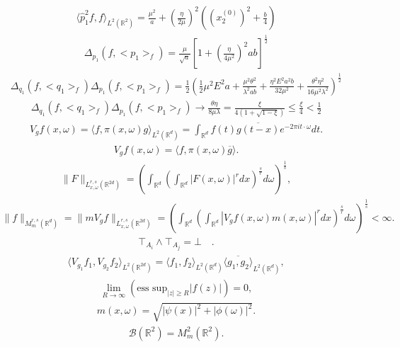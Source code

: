 \begin{align*}\langle \widehat{p}_1^2 f ,f \rangle_{L^2 (\mathbb{R}^2)}= \frac{\mu^2}{a} + \left(\frac{\eta}{2 \mu} \right)^2 \left((x_2^{(0)})^2 + \frac{b}{4} \right)\end{align*}
\begin{align*}\Delta_{p_1} (f, <p_1>_f) = \frac{\mu}{\sqrt{a}} \left[1 + \left(\frac{\eta}{4 \mu^2} \right)^2 ab \right]^{\frac{1}{2}}\end{align*}
\begin{align*}\Delta_{q_1} (f, <q_1>_f) \Delta_{p_1} (f, <p_1>_f) = \frac{1}{2} \left( \frac{1}{2} \mu^2 E^2 a + \frac{\mu^2 \theta^2}{\lambda^2 ab} + \frac{\eta^2 E^2 a^2 b}{32 \mu^2} + \frac{\theta^2 \eta^2}{16 \mu^2 \lambda^2} \right)^{\frac{1}{2}}\end{align*}
\begin{align*}\Delta_{q_1} (f, <q_1>_f) \Delta_{p_1} (f, <p_1>_f) \to \frac{\theta \eta}{8 \mu \lambda} = \frac{\xi}{4 (1 + \sqrt{1- \xi})} \leq \frac{\xi}{4} < \frac{1}{2}\end{align*}
\begin{align*} V_gf(x,\omega)=\langle f,\pi(x,\omega)g \rangle_{L^2 (\mathbb{R}^d)}=\int_{\mathbb{R}^d} f(t)\overline{g(t-x)}e^{-2\pi it \cdot \omega}dt.\end{align*}
\begin{align*}V_gf(x,\omega)=\langle f,\pi(x,\omega) \overline{g} \rangle.\end{align*}
\begin{align*}\|F\|_{L_{x,\omega}^{r,s} (\mathbb{R}^{2d})}=\left(\int_{\mathbb{R}^d} \left(\int_{\mathbb{R}^d} |F(x, \omega)|^r d x\right)^{\frac{s}{r}} d \omega\right)^{\frac{1}{s}},\end{align*}
\begin{align*}\|f\|_{M_m^{r,s} (\mathbb{R}^d)}= \|m V_gf\|_{L_{x,\omega}^{r,s} (\mathbb{R}^{2d})} = \left(\int_{\mathbb{R}^d} \left(\int_{\mathbb{R}^d} |V_g f(x, \omega) m (x, \omega) |^r d x\right)^{\frac{s}{r}} d \omega\right)^{\frac{1}{s}} < \infty.\end{align*}
\begin{align*}\top_{A_i} \wedge \top_{A_j} = \bot \quad.\end{align*}
\begin{align*}\langle V_{g_1} f_1, V_{g_2} f_2 \rangle_{L^2 (\mathbb{R}^{2d})} = \langle f_1,f_2 \rangle_{L^2 (\mathbb{R}^d)} \overline{\langle g_1,g_2 \rangle}_{L^2 (\mathbb{R}^d)},\end{align*}
\begin{align*}\lim_{R \to \infty} \left( \mbox{ess~sup}_{|z| \ge R} |f(z)| \right)=0 ,\end{align*}
\begin{align*}m(x,\omega)= \sqrt{| \psi(x)|^2 + |\phi (\omega)|^2}.\end{align*}
\begin{align*}\mathcal{B} (\mathbb{R}^2)=M_m^2 (\mathbb{R}^2).\end{align*}